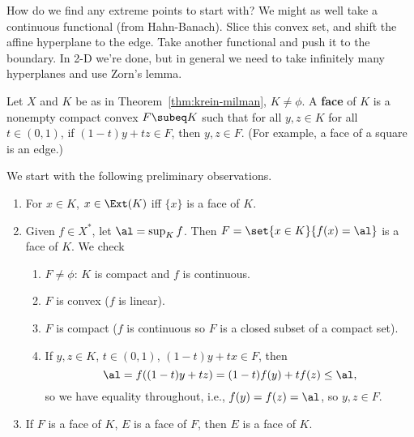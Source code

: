 How do we find any extreme points to start with? We might as well take a continuous functional (from Hahn-Banach). Slice this convex set, and shift the affine hyperplane to the edge. Take another functional and push it to the boundary. In 2-D we're done, but in general we need to take infinitely many hyperplanes and use Zorn's lemma.

Let $X$ and $K$ be as in Theorem~\ref{thm:krein-milman}, $K\ne \phi$. A \textbf{face} of $K$ is a nonempty compact convex $F\subeq K$ such that for all $y,z\in K$ for all $t\in (0,1)$, if $(1-t)y+tz\in F$, then $y,z\in F$. (For example, a face of a square is an edge.)

We start with the following preliminary observations. 
\begin{enumerate}
\item
For $x\in K$, $x\in \Ext(K)$ iff $\{x\}$ is a face of $K$.
\item
Given $f\in X^*$, let $\al=\sup_Kf$. Then $F=\set{x\in K}{f(x)=\al}$ is a face of $K$. We check
\begin{enumerate}
\item
$F\ne \phi$: $K$ is compact and $f$ is continuous.
\item
$F$ is convex ($f$ is linear).
\item
$F$ is compact ($f$ is continuous so $F$ is a closed subset of a compact set).
\item
If $y,z\in K$, $t\in (0,1)$, $(1-t)y+tx\in F$, then 
\[
\al=f((1-t)y+tz)=(1-t)f(y)+tf(z)\le \al,
\]
so we have equality throughout, i.e., $f(y)=f(z)=\al$, so $y,z\in F$.
\end{enumerate}
\item
If $F$ is a face of $K$, $E$ is a face of $F$, then $E$ is a face of $K$.
\end{enumerate}
